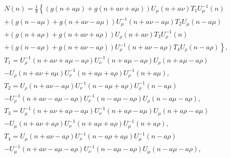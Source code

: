 \begin{equation}
\begin{split}
&N(n)=\frac{1}{8}\left\{(g(n+a\mu)+g(n+a\nu+a\mu))U_{\mu}(n+a\nu)T_1U_{\mu}^{-1}(n)\right.\\
&\left.+(g(n-a\mu)+g(n+a\nu-a\mu))U_{\mu}^{-1}(n+a\nu-a\mu)T_2U_{\mu}(n-a\mu)\right.\\
&\left.+(g(n+a\rho)+g(n+a\nu+a\rho))U_{\rho}(n+a\nu)T_3U_{\rho}^{-1}(n)\right.\\
&\left.+(g(n-a\rho)+g(n+a\nu-a\rho))U_{\rho}^{-1}(n+a\nu-a\rho)T_4U_{\rho}(n-a\rho)\right\},\\
&T_1=U_{\rho}^{-1}(n+a\nu+a\mu-a\rho)U_{\nu}^{-1}(n+a\mu-a\rho)U_{\rho}(n+a\mu-a\rho)\\
&-U_{\rho}(n+a\nu+a\mu)U_{\nu}^{-1}(n+a\mu+a\rho)U_{\rho}^{-1}(n+a\mu),\\
&T_2=U_{\rho}(n+a\nu-a\mu)U_{\nu}^{-1}(n-a\mu+a\rho)U_{\rho}^{-1}(n-a\mu)\\
&-U_{\rho}^{-1}(n+a\nu-a\mu-a\rho)U_{\nu}^{-1}(n-a\mu-a\rho)U_{\rho}(n-a\mu-a\rho),\\
&T_3=U_{\mu}^{-1}(n+a\nu+a\rho-a\mu)U_{\nu}^{-1}(n+a\rho-a\mu)U_{\mu}(n+a\rho-a\mu)\\
&-U_{\mu}(n+a\nu+a\rho)U_{\nu}^{-1}(n+a\mu+a\rho)U_{\mu}^{-1}(n+a\rho),\\
&T_4=U_{\mu}(n+a\nu-a\rho)U_{\nu}^{-1}(n-a\rho+a\mu)U_{\mu}^{-1}(n-a\rho)\\
&-U_{\mu}^{-1}(n+a\nu-a\mu-a\rho)U_{\nu}^{-1}(n-a\mu-a\rho)U_{\mu}(n-a\mu-a\rho),\\
\end{split}
\end{equation}

